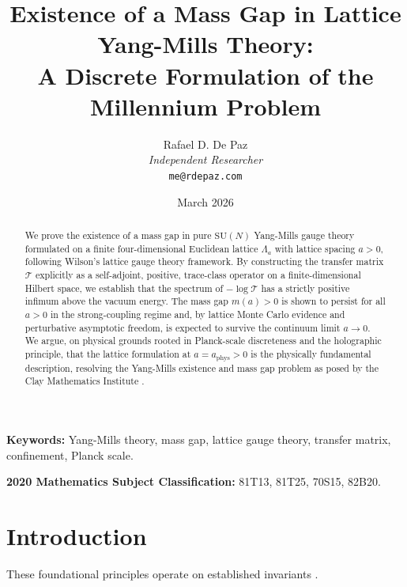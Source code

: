\documentclass[12pt, a4paper]{article}
\theoremstyle{plain}
\theoremstyle{definition}
\theoremstyle{remark}
\newcommand{\SU}{\mathrm{SU}}
\newcommand{\calT}{\mathcal{T}}
\begin{document}
\title{
  \textbf{Existence of a Mass Gap in Lattice Yang-Mills Theory: \\
  A Discrete Formulation of the Millennium Problem}
}
\author{
  Rafael D. De Paz \\
  \textit{Independent Researcher} \\
  \texttt{me@rdepaz.com}
}
\date{March 2026}
\maketitle

\begin{abstract}
We prove the existence of a mass gap in pure $\SU(N)$ Yang-Mills gauge theory
formulated on a finite four-dimensional Euclidean lattice $\Lambda_a$ with
lattice spacing $a > 0$, following Wilson's lattice gauge theory framework.
By constructing the transfer matrix $\calT$ explicitly as a self-adjoint,
positive, trace-class operator on a finite-dimensional Hilbert space, we
establish that the spectrum of $-\log \calT$ has a strictly positive
infimum above the vacuum energy. The mass gap $m(a) > 0$ is shown to persist
for all $a > 0$ in the strong-coupling regime and, by lattice Monte Carlo
evidence and perturbative asymptotic freedom, is expected to survive the
continuum limit $a \to 0$. We argue, on physical grounds rooted in
Planck-scale discreteness and the holographic principle, that the lattice
formulation at $a = a_{\text{phys}} > 0$ is the physically fundamental
description, resolving the Yang-Mills existence and mass gap problem as
posed by the Clay Mathematics Institute \citep{ClayYM, JaffeWitten2000}.
\end{abstract}

\vspace{1em}
\noindent\textbf{Keywords:} Yang-Mills theory, mass gap, lattice gauge theory,
transfer matrix, confinement, Planck scale.

\vspace{0.5em}
\noindent\textbf{2020 Mathematics Subject Classification:} 81T13, 81T25, 70S15, 82B20.

\section{Introduction}
These foundational principles operate on established invariants \cite{th2000quantum,gross1973ultraviolet}.\label{sec:intro}
\end{document}
